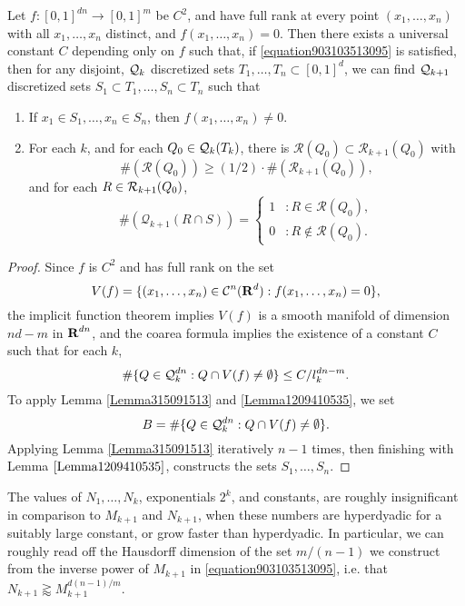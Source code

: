 \begin{corollary} \label{PramanikFraserBuildingBlockLemma}
    Let $f: [0,1]^{dn} \to [0,1]^m$ be $C^2$, and have full rank at every point $(x_1, \dots, x_n)$ with all $x_1, \dots, x_n$ distinct, and $f(x_1, \dots, x_n) = 0$. Then there exists a universal constant $C$ depending only on $f$ such that, if \eqref{equation903103513095} is satisfied, then for any disjoint, $\operatorname{\mathcal{Q}}_k$ discretized sets $T_1, \dots, T_n \subset [0,1]^d$, we can find $\operatorname{\mathcal{Q}}_{k+1}$ discretized sets $S_1 \subset T_1, \dots, S_n \subset T_n$ such that
    \begin{enumerate}
        \item If $x_1 \in S_1, \dots, x_n \in S_n$, then $f(x_1, \dots, x_n) \neq 0$.
        \item For each $k$, and for each $Q_0 \in \operatorname{\mathcal{Q}}_k(T_k)$, there is $\mathcal{R}(Q_0) \subset \mathcal{R}_{k+1}(Q_0)$ with
        \[ \#(\mathcal{R}(Q_0)) \geq (1/2) \cdot \#(\mathcal{R}_{k+1}(Q_0)), \]
        and for each $R \in \operatorname{\mathcal{R}}_{k+1}(Q_0)$,
        \[ \#(\mathcal{Q}_{k+1}(R \cap S)) = \begin{cases} 1 &: R \in \mathcal{R}(Q_0), \\ 0 &: R \not \in \mathcal{R}(Q_0). \end{cases} \]
    \end{enumerate}
\end{corollary}
\begin{proof}
    Since $f$ is $C^2$ and has full rank on the set
    \[ V(f) = \{ (x_1, \dots, x_n) \in \operatorname{\mathcal{C}}^n(\operatorname{\mathbf{R}}^d) : f(x_1, \dots, x_n) = 0 \}, \]
    the implicit function theorem implies $V(f)$ is a smooth manifold of dimension $nd - m$ in $\operatorname{\mathbf{R}}^{dn}$, and the coarea formula implies the existence of a constant $C$ such that for each $k$,
    \[ \# \{ Q \in \operatorname{\mathcal{Q}}_k^{dn} : Q \cap V(f) \neq \emptyset \} \leq C/l_k^{dn-m}. \]
    To apply Lemma \ref{Lemma315091513} and \ref{Lemma1209410535}, we set
    \[ B = \# \{ Q \in \operatorname{\mathcal{Q}}_k^{dn} : Q \cap V(f) \neq \emptyset \}. \]
    Applying Lemma \ref{Lemma315091513} iteratively $n-1$ times, then finishing with Lemma $\ref{Lemma1209410535}$, constructs the sets $S_1, \dots, S_n$.
\end{proof}

\begin{remark}
    The values of $N_1, \dots, N_k$, exponentials $2^k$, and constants, are roughly insignificant in comparison to $M_{k+1}$ and $N_{k+1}$, when these numbers are hyperdyadic for a suitably large constant, or grow faster than hyperdyadic. In particular, we can roughly read off the Hausdorff dimension of the set $m/(n-1)$ we construct from the inverse power of $M_{k+1}$ in \eqref{equation903103513095}, i.e. that $N_{k+1} \gtrapprox M_{k+1}^{d(n-1)/m}$.
\end{remark}

